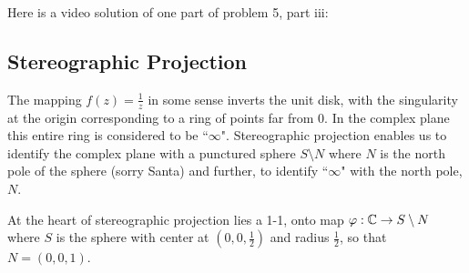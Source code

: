 \documentclass[handout]{ximera}
\begin{document}
Here is a video solution of one part of problem 5, part iii:\\
\begin{foldable}
\end{foldable}

\subsection{Stereographic Projection}


The mapping $f(z) = \frac{1}{z}$ in some sense inverts the unit disk, with the singularity at the origin corresponding to a ring of points far from 0.
In the complex plane this entire ring is considered to be ``$\infty$". Stereographic projection enables us to identify the complex plane with a punctured 
sphere $S\setminus N$ where $N$ is the north pole of the sphere (sorry Santa) and further, to identify ``$\infty$" with the north pole, $N$.

At the heart of stereographic projection lies a 1-1, onto map $\varphi: \mathbb C\to S\setminus N $ where $S$ is the sphere with 
center at $\left(0,0,\tfrac12\right)$ and radius $\tfrac12$, so that $N = (0,0,1)$. 




\begin{image}
\end{image}
\end{document}
